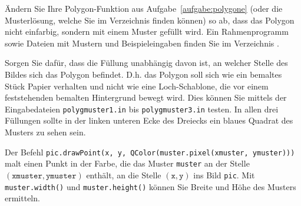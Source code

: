 %
Ändern Sie Ihre Polygon-Funktion aus Aufgabe~\ref{aufgabe:polygone}
(oder die Musterlösung, welche Sie im Verzeichnis
 finden können) so ab, 
dass das Polygon nicht einfarbig, sondern mit einem Muster gefüllt wird. 
Ein Rahmenprogramm sowie Dateien mit Mustern und Beispieleingaben finden 
Sie im Verzeichnis .

Sorgen Sie dafür, dass die Füllung unabhängig davon ist, an welcher
Stelle des Bildes sich das Polygon befindet. D.h. das Polygon soll sich
wie ein bemaltes Stück Papier verhalten und nicht wie eine 
Loch-Schablone, die vor einem feststehenden bemalten Hintergrund bewegt 
wird. Dies können Sie mittels der Eingabedateien 
\texttt{polygmuster1.in} bis \texttt{polygmuster3.in} testen. In allen 
drei Füllungen sollte in der linken unteren Ecke des Dreiecks ein blaues
Quadrat des Musters zu sehen sein.

Der Befehl
\texttt{pic.drawPoint(x, y, QColor(muster.pixel(xmuster, ymuster)))}
malt einen Punkt in der Farbe, die das Muster \texttt{muster} an der
Stelle $(\mathtt{xmuster},\mathtt{ymuster})$ enthält, an die Stelle 
$(\mathtt{x},\mathtt{y})$ ins Bild \texttt{pic}. Mit 
\texttt{muster.width()} und \texttt{muster.height()} können Sie Breite 
und Höhe des Musters ermitteln.
